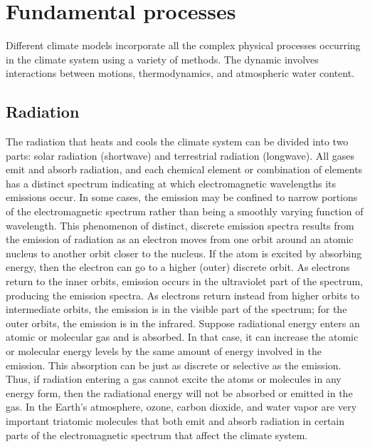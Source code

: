 
\chapter{Fundamental processes}
Different climate models incorporate all the complex physical processes occurring in the climate system using a variety of methods. The dynamic involves interactions between motions, thermodynamics, and atmospheric water content.

\section{Radiation}
The radiation that heats and cools the climate system can be divided into two parts: solar radiation (shortwave) and terrestrial radiation (longwave).
All gases emit and absorb radiation, and each chemical element or combination of elements has a distinct spectrum indicating at which electromagnetic wavelengths its emissions occur. In some cases, the emission may be confined to narrow portions of the electromagnetic spectrum rather than being a smoothly varying function of wavelength. This phenomenon of distinct, discrete emission spectra results from the emission of radiation as an electron moves from one orbit around an atomic nucleus to another orbit closer to the nucleus. If the atom is excited by absorbing energy, then the electron can go to a higher (outer) discrete orbit.
As electrons return to the inner orbits, emission occurs in the ultraviolet part of the spectrum, producing the emission spectra. As electrons return instead from higher orbits to intermediate orbits, the emission is in the visible part of the spectrum; for the outer orbits, the emission is in the infrared.
Suppose radiational energy enters an atomic or molecular gas and is absorbed. In that case, it can increase the atomic or molecular energy levels by the same amount of energy involved in the emission. This absorption can be just as discrete or selective as the emission. Thus, if radiation entering a gas cannot excite the atoms or molecules in any energy form, then the radiational energy will not be absorbed or emitted in the gas. In the Earth's atmosphere, ozone, carbon dioxide, and water vapor are very important triatomic molecules that both emit and absorb radiation in certain parts of the electromagnetic spectrum that affect the climate system.

